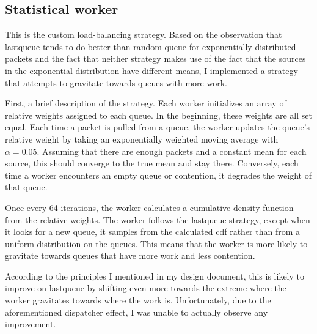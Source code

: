 \documentclass{article}
\begin{document}
\subsection*{Statistical worker}
This is the custom load-balancing strategy. Based on the observation that lastqueue tends to do better than random-queue for exponentially distributed packets and the fact that neither strategy makes use of the fact that the sources in the exponential distribution have different means, I implemented a strategy that attempts to gravitate towards queues with more work.

First, a brief description of the strategy. Each worker initializes an array of relative weights assigned to each queue. In the beginning, these weights are all set equal. Each time a packet is pulled from a queue, the worker updates the queue's relative weight by taking an exponentially weighted moving average with $\alpha=0.05$. Assuming that there are enough packets and a constant mean for each source, this should converge to the true mean and stay there. Conversely, each time a worker encounters an empty queue or contention, it degrades the weight of that queue.

Once every 64 iterations, the worker calculates a cumulative density function from the relative weights. The worker follows the lastqueue strategy, except when it looks for a new queue, it samples from the calculated cdf rather than from a uniform distribution on the queues. This means that the worker is more likely to gravitate towards queues that have more work and less contention. 

According to the principles I mentioned in my design document, this is likely to improve on lastqueue by shifting even more towards the extreme where the worker gravitates towards where the work is. Unfortunately, due to the aforementioned dispatcher effect, I was unable to actually observe any improvement.
\end{document}
